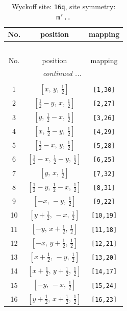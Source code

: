 \documentclass[fleqn,8pt]{jsarticle}
\begin{document}
\renewcommand{\arraystretch}{1.2}
\begin{longtable}{ccc}
\caption{Wyckoff site: {\tt 16q}, site symmetry: {\tt m'..}}
 \\
 \hline \hline
No. & position & mapping \\ \hline \endfirsthead

\multicolumn{2}{l}{\tablename\ \thetable{}} \\
 \hline \hline
No. & position & mapping \\ \hline \endhead

 \hline \hline
\multicolumn{2}{r}{\footnotesize\it continued ...} \\ \endfoot

 \hline \hline
\multicolumn{2}{r}{} \\ \endlastfoot

1 & $\left[ x,\, y,\, \frac{1}{2} \right]$ & {\tt [1,30]} \\ \hline
2 & $\left[ \frac{1}{2} - y,\, x,\, \frac{1}{2} \right]$ & {\tt [2,27]} \\ \hline
3 & $\left[ y,\, \frac{1}{2} - x,\, \frac{1}{2} \right]$ & {\tt [3,26]} \\ \hline
4 & $\left[ x,\, \frac{1}{2} - y,\, \frac{1}{2} \right]$ & {\tt [4,29]} \\ \hline
5 & $\left[ \frac{1}{2} - x,\, y,\, \frac{1}{2} \right]$ & {\tt [5,28]} \\ \hline
6 & $\left[ \frac{1}{2} - x,\, \frac{1}{2} - y,\, \frac{1}{2} \right]$ & {\tt [6,25]} \\ \hline
7 & $\left[ y,\, x,\, \frac{1}{2} \right]$ & {\tt [7,32]} \\ \hline
8 & $\left[ \frac{1}{2} - y,\, \frac{1}{2} - x,\, \frac{1}{2} \right]$ & {\tt [8,31]} \\ \hline
9 & $\left[ - x,\, - y,\, \frac{1}{2} \right]$ & {\tt [9,22]} \\ \hline
10 & $\left[ y + \frac{1}{2},\, - x,\, \frac{1}{2} \right]$ & {\tt [10,19]} \\ \hline
11 & $\left[ - y,\, x + \frac{1}{2},\, \frac{1}{2} \right]$ & {\tt [11,18]} \\ \hline
12 & $\left[ - x,\, y + \frac{1}{2},\, \frac{1}{2} \right]$ & {\tt [12,21]} \\ \hline
13 & $\left[ x + \frac{1}{2},\, - y,\, \frac{1}{2} \right]$ & {\tt [13,20]} \\ \hline
14 & $\left[ x + \frac{1}{2},\, y + \frac{1}{2},\, \frac{1}{2} \right]$ & {\tt [14,17]} \\ \hline
15 & $\left[ - y,\, - x,\, \frac{1}{2} \right]$ & {\tt [15,24]} \\ \hline
16 & $\left[ y + \frac{1}{2},\, x + \frac{1}{2},\, \frac{1}{2} \right]$ & {\tt [16,23]} \\
\end{longtable}
\end{document}

